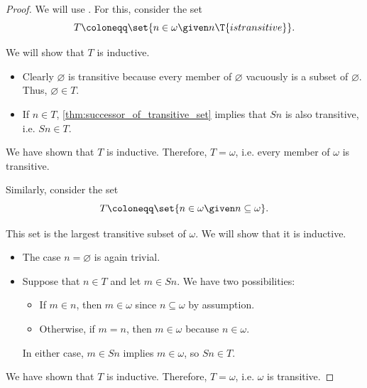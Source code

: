 \begin{proof}
   We will use . For this, consider the set
  \begin{equation*}
    T \coloneqq \set{ n \in \omega \given n \T{is transitive} }.
  \end{equation*}

  We will show that \( T \) is inductive.
  \begin{itemize}
    \item Clearly \( \varnothing \) is transitive because every member of \( \varnothing \) vacuously is a subset of \( \varnothing \). Thus, \( \varnothing \in T \).

    \item If \( n \in T \), \cref{thm:successor_of_transitive_set} implies that \( Sn \) is also transitive, i.e. \( Sn \in T \).
  \end{itemize}

  We have shown that \( T \) is inductive. Therefore, \( T = \omega \), i.e. every member of \( \omega \) is transitive.

   Similarly, consider the set
  \begin{equation*}
    T \coloneqq \set{ n \in \omega \given n \subseteq \omega }.
  \end{equation*}

  This set is the largest transitive subset of \( \omega \). We will show that it is inductive.
  \begin{itemize}
    \item The case \( n = \varnothing \) is again trivial.

    \item Suppose that \( n \in T \) and let \( m \in Sn \). We have two possibilities:
    \begin{itemize}
      \item If \( m \in n \), then \( m \in \omega \) since \( n \subseteq \omega \) by assumption.
      \item Otherwise, if \( m = n \), then \( m \in \omega \) because \( n \in \omega \).
    \end{itemize}

    In either case, \( m \in Sn \) implies \( m \in \omega \), so \( Sn \in T \).
  \end{itemize}

  We have shown that \( T \) is inductive. Therefore, \( T = \omega \), i.e. \( \omega \) is transitive.
\end{proof}

